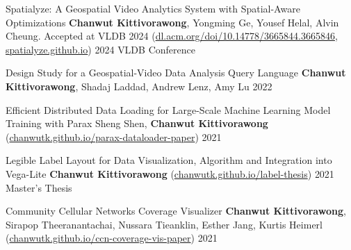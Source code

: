 

\begin{cvpubs}

  \cvpub
    {Spatialyze: A Geospatial Video Analytics System with Spatial-Aware Optimizations} %
    {\textbf{Chanwut Kittivorawong}, Yongming Ge, Yousef Helal, Alvin Cheung. Accepted at VLDB 2024 (\href{https://dl.acm.org/doi/10.14778/3665844.3665846}{dl.acm.org/doi/10.14778/3665844.3665846}, \href{https://spatialyze.github.io}{spatialyze.github.io})} %
    {2024} %
    {VLDB Conference} %
    
  \cvpub
    {Design Study for a Geospatial-Video Data Analysis Query Language} %
    {\textbf{Chanwut Kittivorawong}, Shadaj Laddad, Andrew Lenz, Amy Lu} %
    {2022} %
    {} %

  \cvpub
    {Efficient Distributed Data Loading for Large-Scale Machine Learning Model Training with Parax} %
    {Sheng Shen, \textbf{Chanwut Kittivorawong} (\href{https://chanwutk.github.io/parax-dataloader-paper}{chanwutk.github.io/parax-dataloader-paper})} %
    {2021} %
    {} %

  \cvpub
    {Legible Label Layout for Data Visualization, Algorithm and Integration into Vega-Lite} %
    {\textbf{Chanwut Kittivorawong} (\href{https://chanwutk.github.io/label-thesis}{chanwutk.github.io/label-thesis})} %
    {2021} %
    {Master's Thesis} %

  \cvpub
    {Community Cellular Networks Coverage Visualizer} %
    {\textbf{Chanwut Kittivorawong}, Sirapop Theeranantachai, Nussara Tieanklin, Esther Jang, Kurtis Heimerl (\href{https://chanwutk.github.io/ccn-coverage-vis-paper}{chanwutk.github.io/ccn-coverage-vis-paper})} %
    {2021} %
    {} %



\end{cvpubs}
